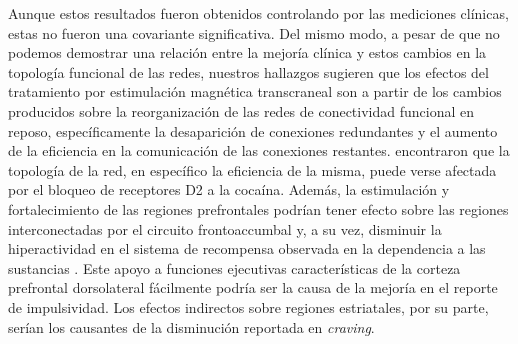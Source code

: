 Aunque estos resultados fueron obtenidos controlando por las mediciones clínicas, estas no fueron una covariante significativa. Del mismo modo, a pesar de que no podemos demostrar una relación entre la mejoría clínica y estos cambios en la topología funcional de las redes, nuestros hallazgos sugieren que los efectos del tratamiento por estimulación magnética transcraneal son a partir de los cambios producidos sobre la reorganización de las redes de conectividad funcional en reposo, específicamente la desaparición de conexiones redundantes y el aumento de la eficiencia en la comunicación de las conexiones restantes. \textcite{Achard2007} encontraron que la topología de la red, en específico la eficiencia de la misma, puede verse afectada por el bloqueo de receptores D2 a la cocaína. Además, la estimulación y fortalecimiento de las regiones prefrontales podrían tener efecto sobre las regiones interconectadas por el circuito frontoaccumbal y, a su vez, disminuir la hiperactividad en el sistema de recompensa observada en la dependencia a las sustancias \parencite{Volkow2010a}. Este apoyo a funciones ejecutivas características de la corteza prefrontal dorsolateral fácilmente podría ser la causa de la mejoría en el reporte de impulsividad. Los efectos indirectos sobre regiones estriatales, por su parte, serían los causantes de la disminución reportada en \textit{craving}.

